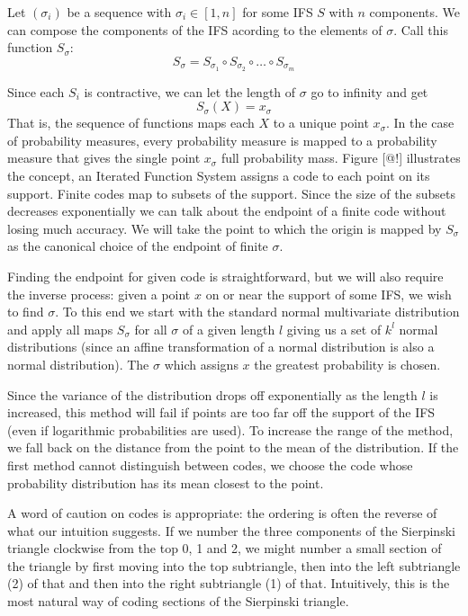 \documentclass[10pt,a4paper,oneside]{article}
\theoremstyle{definition}
\begin{document}
Let $(\sigma_i)$ be a sequence with $\sigma_i \in [1, n]$ for some IFS $S$ with $n$ components. We can compose the components of the IFS acording to the elements of $\sigma$. Call this function $S_\sigma$:
\[
S_\sigma = S_{\sigma_1} \circ S_{\sigma_2} \circ \ldots \circ S_{\sigma_m}
\]

Since each $S_i$ is contractive, we can let the length of $\sigma$ go to infinity and get 
\[
S_\sigma(X) = x_\sigma  
\] 
That is, the sequence of functions maps each $X$ to a unique point $x_\sigma$. In the case of probability measures, every probability measure is mapped to a probability measure that gives the single point $x_\sigma$ full probability mass. Figure [@!] illustrates the concept, an Iterated Function System assigns a code to each point on its support. Finite codes map to subsets of the support. Since the size of the subsets decreases exponentially we can talk about the endpoint of a finite code without losing much accuracy. We will take the point to which the origin is mapped by $S_\sigma$ as the canonical choice of the endpoint of finite $\sigma$.

Finding the endpoint for given code is straightforward, but we will also require the inverse process: given a point $x$ on or near the support of some IFS, we wish to find $\sigma$. To this end we start with the standard normal multivariate distribution and apply all maps $S_\sigma$ for all $\sigma$ of a given length $l$ giving us a set of $k^l$ normal distributions (since an affine transformation of a normal distribution is also a normal distribution). The $\sigma$ which assigns $x$ the greatest probability is chosen.

Since the variance of the distribution drops off exponentially as the length $l$ is increased, this method will fail if points are too far off the support of the IFS (even if logarithmic probabilities are used). To increase the range of the method, we fall back on the distance from the point to the mean of the distribution. If the first method cannot distinguish between codes, we choose the code whose probability distribution has its mean closest to the point.

A word of caution on codes is appropriate: the ordering is often the reverse of what our intuition suggests. If we number the three components of the Sierpinski triangle clockwise from the top 0, 1 and 2, we might number a small section of the triangle by first moving into the top subtriangle, then into the left subtriangle (2) of that and then into the right subtriangle (1) of that. Intuitively, this is the most natural way of coding sections of the Sierpinski triangle.
\end{document}

